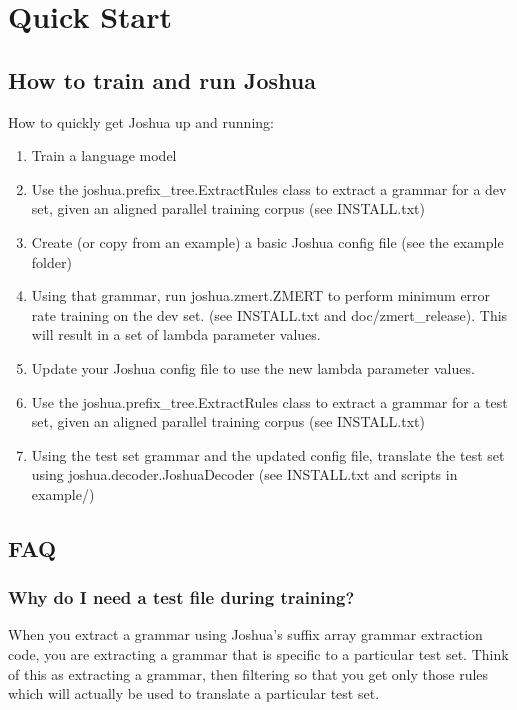 \chapter{Quick Start}

\section{How to train and run Joshua}

How to quickly get Joshua up and running:

 \begin{enumerate}
 \item Train a language model
 \item Use the joshua.prefix\_tree.ExtractRules class to extract a grammar for a dev set, given an aligned parallel training corpus (see INSTALL.txt)
 \item Create (or copy from an example) a basic Joshua config file (see the example folder)
 \item Using that grammar, run joshua.zmert.ZMERT to perform minimum error rate training on the dev set. (see INSTALL.txt and doc/zmert\_release). This will result in a set of lambda parameter values.
\item Update your Joshua config file to use the new lambda parameter values.
\item Use the joshua.prefix\_tree.ExtractRules class to extract a grammar for a test set, given an aligned parallel training corpus (see INSTALL.txt)
\item Using the test set grammar and the updated config file, translate the test set using joshua.decoder.JoshuaDecoder (see INSTALL.txt and scripts in example/)
 \end{enumerate}


\section{FAQ}

\subsection{Why do I need a test file during training?}

When you extract a grammar using Joshua's suffix array grammar extraction code, you are extracting a grammar that is specific to a particular test set. Think of this as extracting a grammar, then filtering so that you get only those rules which will actually be used to translate a particular test set.

